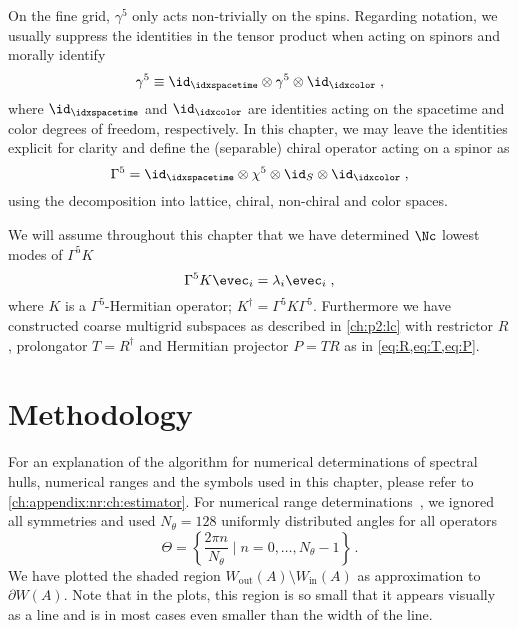 On the fine grid, $\gamma^5$ only acts non-trivially on the spins.
Regarding notation, we usually suppress the identities in the tensor product when acting on spinors and morally identify
\begin{equation}
\gamma^5 \equiv \id_{\idxspacetime} \otimes \gamma^5 \otimes \id_{\idxcolor} \;,
\end{equation}
where $\id_{\idxspacetime}$ and $\id_{\idxcolor}$ are identities acting on the spacetime and color degrees of freedom, respectively.
In this chapter, we may leave the identities explicit for clarity and define the (separable) chiral operator acting on a spinor as
\begin{equation}
\Gamma^5 = \id_{\idxspacetime} \otimes \chi^5 \otimes \id_S \otimes \id_{\idxcolor} \;,
\end{equation}
using the decomposition into lattice, chiral, non-chiral and color spaces.

We will assume throughout this chapter that we have determined $\Nc$ lowest modes of $\Gamma^{5} K$
\begin{equation} \label{eq:fine:low:modes}
\Gamma^5 K \evec_i = \lambda_i \evec_i \;,
\end{equation}
where $K$ is a $\Gamma^{5}$-Hermitian operator; $K^{\dagger} = \Gamma^{5} K \Gamma^{5}$.
Furthermore we have constructed coarse multigrid subspaces as described in \cref{ch:p2:lc} with restrictor $R$, prolongator $T=R^{\dagger}$ and Hermitian projector $P = TR$ as in \cref{eq:R,eq:T,eq:P}.

\section{Methodology}

For an explanation of the algorithm for numerical determinations of spectral hulls, numerical ranges and the symbols used in this chapter, please refer to \cref{ch:appendix:nr:ch:estimator}.
For numerical range determinations~\cite{johnson1978numerical}, we ignored all symmetries and used $N_{\theta}=128$ uniformly distributed angles for all operators
\begin{equation}
\Theta = \left\{ \frac{2 \pi n}{N_{\theta}} \mid n = 0, \ldots, N_{\theta}-1 \right\} \,.
\end{equation}
We have plotted the shaded region $W_{\text{out}}(A) \setminus W_{\text{in}}(A)$ as approximation to $\partial W(A)$.
Note that in the plots, this region is so small that it appears visually as a line and is in most cases even smaller than the width of the line.

